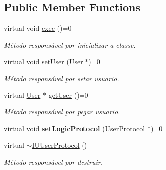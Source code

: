 \subsection*{Public Member Functions}
\begin{DoxyCompactItemize}
\item 
\hypertarget{class_i_u_user_protocol_a10759062ea5be83d3beb94fb765b77b8}{virtual void \hyperlink{class_i_u_user_protocol_a10759062ea5be83d3beb94fb765b77b8}{exec} ()=0}\label{class_i_u_user_protocol_a10759062ea5be83d3beb94fb765b77b8}

\begin{DoxyCompactList}\small\item\em Método responsável por inicializar a classe. \end{DoxyCompactList}\item 
\hypertarget{class_i_u_user_protocol_aef57f2179f890cbb1d9010b491033fcf}{virtual void \hyperlink{class_i_u_user_protocol_aef57f2179f890cbb1d9010b491033fcf}{set\-User} (\hyperlink{class_user}{User} $\ast$)=0}\label{class_i_u_user_protocol_aef57f2179f890cbb1d9010b491033fcf}

\begin{DoxyCompactList}\small\item\em Método responsável por setar usuario. \end{DoxyCompactList}\item 
\hypertarget{class_i_u_user_protocol_aceaf5a48595a80d71ef2f90fa185b488}{virtual \hyperlink{class_user}{User} $\ast$ \hyperlink{class_i_u_user_protocol_aceaf5a48595a80d71ef2f90fa185b488}{get\-User} ()=0}\label{class_i_u_user_protocol_aceaf5a48595a80d71ef2f90fa185b488}

\begin{DoxyCompactList}\small\item\em Método responsável por pegar usuario. \end{DoxyCompactList}\item 
\hypertarget{class_i_u_user_protocol_aeee75f26805eff9a23319bae1b12ba82}{virtual void {\bfseries set\-Logic\-Protocol} (\hyperlink{class_user_protocol}{User\-Protocol} $\ast$)=0}\label{class_i_u_user_protocol_aeee75f26805eff9a23319bae1b12ba82}

\item 
\hypertarget{class_i_u_user_protocol_ac74905386db12ce833eb85a2251d96fb}{virtual \hyperlink{class_i_u_user_protocol_ac74905386db12ce833eb85a2251d96fb}{$\sim$\-I\-U\-User\-Protocol} ()}\label{class_i_u_user_protocol_ac74905386db12ce833eb85a2251d96fb}

\begin{DoxyCompactList}\small\item\em Método responsável por destruir. \end{DoxyCompactList}\end{DoxyCompactItemize}


